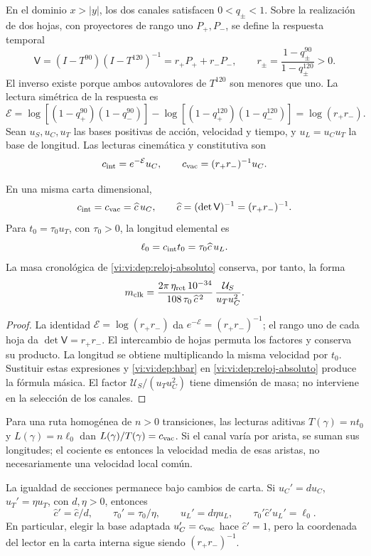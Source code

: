 En el dominio \(x>|y|\), los dos canales satisfacen \(0<q_\pm<1\).
Sobre la realización de dos hojas, con proyectores de rango uno
\(P_+,P_-\), se define la respuesta temporal
\[
 \mathsf V=(I-T^{90})(I-T^{120})^{-1}
          =r_+P_++r_-P_-,
 \qquad r_\pm=\frac{1-q_\pm^{90}}{1-q_\pm^{120}}>0.
\]
El inverso existe porque ambos autovalores de \(T^{120}\) son menores
que uno. La lectura simétrica de la respuesta es
\[
 \mathcal E=
 \log[(1-q_+^{90})(1-q_-^{90})]
 -\log[(1-q_+^{120})(1-q_-^{120})]
 =\log(r_+r_-).
\]
Sean \(u_S,u_C,u_T\) las bases positivas de acción, velocidad y
tiempo, y \(u_L=u_Cu_T\) la base de longitud. Las lecturas
cinemática y constitutiva son
\[
 c_{\rm int}=e^{-\mathcal E}u_C,\qquad
 c_{\rm vac}=(r_+r_-)^{-1}u_C.
\]

\begin{proposition}
\label{vi:vi:dep:velocidad-comun}
En una misma carta dimensional,
\[
 c_{\rm int}=c_{\rm vac}=\widehat c\,u_C,
 \qquad \widehat c=(\det\mathsf V)^{-1}=(r_+r_-)^{-1}.
\]
Para \(t_0=\tau_0u_T\), con \(\tau_0>0\), la longitud elemental es
\[
 \ell_0=c_{\rm int}t_0=\tau_0\widehat c\,u_L.
\]
La masa cronológica de \eqref{vi:vi:dep:reloj-absoluto} conserva, por
tanto, la forma
\[
 m_{\rm clk}=
 \frac{2\pi\,\eta_{\rm ret}\,10^{-34}}
      {108\,\tau_0\,\widehat c^{\,2}}\,
 \frac{\mathcal U_S}{u_Tu_C^2}.
\]
\end{proposition}
\begin{proof}
La identidad \(\mathcal E=\log(r_+r_-)\) da
\(e^{-\mathcal E}=(r_+r_-)^{-1}\); el rango uno de cada hoja da
\(\det\mathsf V=r_+r_-\). El intercambio de hojas permuta los
factores y conserva su producto. La longitud se obtiene multiplicando
la misma velocidad por \(t_0\). Sustituir estas expresiones y
\eqref{vi:vi:dep:hbar} en \eqref{vi:vi:dep:reloj-absoluto} produce la
fórmula másica. El factor \(\mathcal U_S/(u_Tu_C^2)\) tiene
dimensión de masa; no interviene en la selección de los canales.
\end{proof}

Para una ruta homogénea de \(n>0\) transiciones, las lecturas aditivas
\(T(\gamma)=nt_0\) y \(L(\gamma)=n\ell_0\) dan
\(L(\gamma)/T(\gamma)=c_{\rm vac}\). Si el canal varía por
arista, se suman sus longitudes; el cociente es entonces la velocidad
media de esas aristas, no necesariamente una velocidad local común.

La igualdad de secciones permanece bajo cambios de carta. Si
\(u_C'=du_C\), \(u_T'=\eta u_T\), con \(d,\eta>0\), entonces
\[
 \widehat c'=\widehat c/d,\qquad
 \tau_0'=\tau_0/\eta,\qquad u_L'=d\eta u_L,
 \qquad
 \tau_0'\widehat c'u_L'=\ell_0.
\]
En particular, elegir la base adaptada \(u_C'=c_{\rm vac}\)
hace \(\widehat c'=1\), pero la coordenada del lector en la
carta interna sigue siendo \((r_+r_-)^{-1}\).

